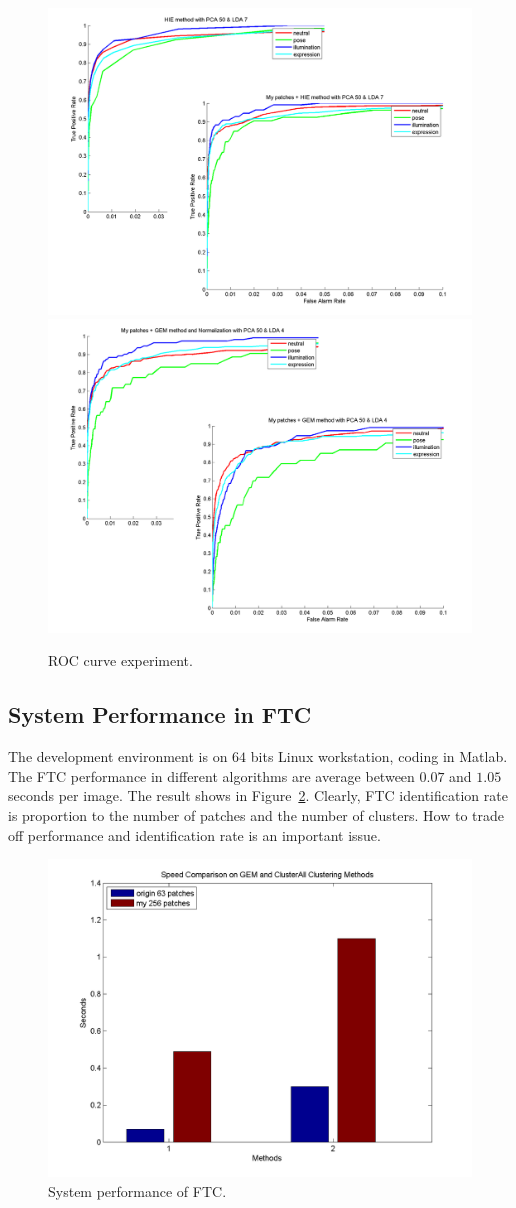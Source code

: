 \documentclass[10pt,twocolumn,letterpaper]{article}
\begin{document}
\begin{figure}[t]
    \begin{center}
        \includegraphics[width=0.4\linewidth]{fig/ftc/ftc_roc_com1.png}
        \includegraphics[width=0.4\linewidth]{fig/ftc/ftc_roc_com2.png}
    \end{center}
    \caption{ROC curve experiment.}
    \label{fig:ftc_roc_com}
\end{figure}


\subsection{System Performance in FTC}
The development environment is on $64$ bits Linux workstation, coding in Matlab.
The FTC performance in different algorithms are average between $0.07$ and $1.05$
seconds per image. The result shows in Figure~\ref{fig:ftc_time}.
Clearly, FTC identification rate is proportion to the number of patches and
the number of clusters. How to trade off performance and identification rate
is an important issue.

\begin{figure}[t]
    \begin{center}
        \includegraphics[width=0.8\linewidth]{fig/ftc/ftc_time.png}
    \end{center}
    \caption{System performance of FTC.}
    \label{fig:ftc_time}
\end{figure}
\end{document}
